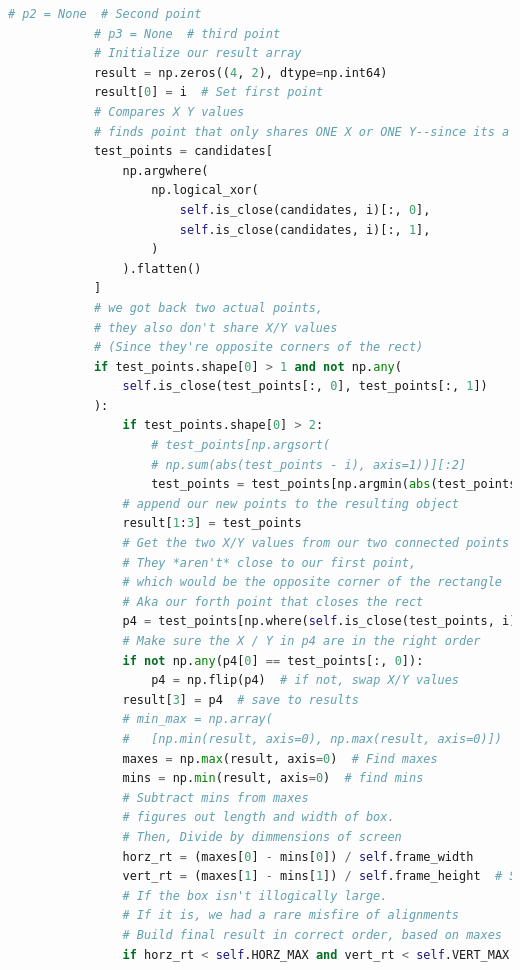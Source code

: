 \documentclass{report}
\begin{document}
\begin{lstlisting}[language=python, caption={The \texttt{group_points} algorithm used in object detection}]
            # p2 = None  # Second point
            # p3 = None  # third point
            # Initialize our result array
            result = np.zeros((4, 2), dtype=np.int64)
            result[0] = i  # Set first point
            # Compares X Y values
            # finds point that only shares ONE X or ONE Y--since its a rectangle
            test_points = candidates[
                np.argwhere(
                    np.logical_xor(
                        self.is_close(candidates, i)[:, 0],
                        self.is_close(candidates, i)[:, 1],
                    )
                ).flatten()
            ]
            # we got back two actual points,
            # they also don't share X/Y values
            # (Since they're opposite corners of the rect)
            if test_points.shape[0] > 1 and not np.any(
                self.is_close(test_points[:, 0], test_points[:, 1])
            ):
                if test_points.shape[0] > 2:
                    # test_points[np.argsort(
                    # np.sum(abs(test_points - i), axis=1))][:2]
                    test_points = test_points[np.argmin(abs(test_points - i), axis=0)]
                # append our new points to the resulting object
                result[1:3] = test_points
                # Get the two X/Y values from our two connected points
                # They *aren't* close to our first point,
                # which would be the opposite corner of the rectangle
                # Aka our forth point that closes the rect
                p4 = test_points[np.where(self.is_close(test_points, i) != True)]
                # Make sure the X / Y in p4 are in the right order
                if not np.any(p4[0] == test_points[:, 0]):
                    p4 = np.flip(p4)  # if not, swap X/Y values
                result[3] = p4  # save to results
                # min_max = np.array(
                #   [np.min(result, axis=0), np.max(result, axis=0)])
                maxes = np.max(result, axis=0)  # Find maxes
                mins = np.min(result, axis=0)  # find mins
                # Subtract mins from maxes
                # figures out length and width of box.
                # Then, Divide by dimmensions of screen
                horz_rt = (maxes[0] - mins[0]) / self.frame_width
                vert_rt = (maxes[1] - mins[1]) / self.frame_height  # Same for height
                # If the box isn't illogically large.
                # If it is, we had a rare misfire of alignments
                # Build final result in correct order, based on maxes
                if horz_rt < self.HORZ_MAX and vert_rt < self.VERT_MAX:

\end{lstlisting}
\end{document}

